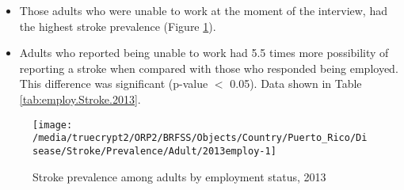  
 \newpage
\begin{itemize}


\item Those adults who were unable to work at the moment of the interview, had the highest stroke prevalence (Figure \ref{fig:employ.Stroke.2013}).

\item Adults who reported being unable to work had 5.5 times more possibility of reporting a stroke when compared with those who responded being employed. This difference was significant (p-value $<$ 0.05). Data shown in Table \ref{tab:employ.Stroke.2013}.


\end{itemize}

\begin{figure}[H]
\caption{Stroke prevalence among adults by employment status, 
         2013}
\label{fig:employ.Stroke.2013}
\begin{knitrout}
\color{fgcolor}

{\centering \texttt{[image: /media/truecrypt2/ORP2/BRFSS/Objects/Country/Puerto\_Rico/Disease/Stroke/Prevalence/Adult/2013employ-1]} 

}



\end{knitrout}
 \end{figure}

